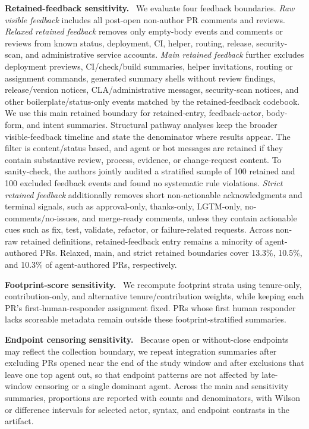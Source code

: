 \documentclass[10pt,conference,anonymous]{IEEEtran}
\newcommand{\runinhead}[1]{\noindent\textbf{#1.}\ }
\begin{document}
\runinhead{Retained-feedback sensitivity}
We evaluate four feedback boundaries.
\emph{Raw visible feedback} includes all post-open non-author PR comments and reviews.
\emph{Relaxed retained feedback} removes only empty-body events and comments or reviews from known status, deployment, CI, helper, routing, release, security-scan, and administrative service accounts.
\emph{Main retained feedback} further excludes deployment previews, CI/check/build summaries, helper invitations, routing or assignment commands, generated summary shells without review findings, release/version notices, CLA/administrative messages, security-scan notices, and other boilerplate/status-only events matched by the retained-feedback codebook.
We use this main retained boundary for retained-entry, feedback-actor, body-form, and intent summaries.
Structural pathway analyses keep the broader visible-feedback timeline and state the denominator where results appear.
The filter is content/status based, and agent or bot messages are retained if they contain substantive review, process, evidence, or change-request content.
To sanity-check, the authors jointly audited a stratified sample of 100 retained and 100 excluded feedback events and found no systematic rule violations.
\emph{Strict retained feedback} additionally removes short non-actionable acknowledgments and terminal signals, such as approval-only, thanks-only, LGTM-only, no-comments/no-issues, and merge-ready comments, unless they contain actionable cues such as fix, test, validate, refactor, or failure-related requests.
Across non-raw retained definitions, retained-feedback entry remains a minority of agent-authored PRs.
Relaxed, main, and strict retained boundaries cover 13.3\%, 10.5\%, and 10.3\% of agent-authored PRs, respectively.

\runinhead{Footprint-score sensitivity}
We recompute footprint strata using tenure-only, contribution-only, and alternative tenure/contribution weights, while keeping each PR's first-human-responder assignment fixed.
PRs whose first human responder lacks scoreable metadata remain outside these footprint-stratified summaries.

\runinhead{Endpoint censoring sensitivity}
Because open or without-close endpoints may reflect the collection boundary, we repeat integration summaries after excluding PRs opened near the end of the study window and after exclusions that leave one top agent out, so that endpoint patterns are not affected by late-window censoring or a single dominant agent.
Across the main and sensitivity summaries, proportions are reported with counts and denominators, with Wilson or difference intervals for selected actor, syntax, and endpoint contrasts in the artifact.
\end{document}

